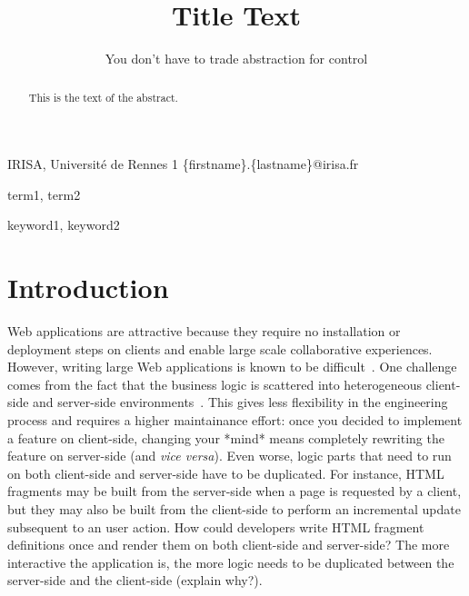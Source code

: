 \documentclass[preprint]{sigplanconf}
\begin{document}
\copyrightdata{[to be supplied]} 


\title{Title Text}
\subtitle{You don’t have to trade abstraction for control}

           {IRISA, Université de Rennes 1}
           {\{firstname\}.\{lastname\}@irisa.fr}

\maketitle

\begin{abstract}
This is the text of the abstract.
\end{abstract}


\terms
term1, term2

\keywords
keyword1, keyword2

\section{Introduction}

Web applications are attractive because they require no installation or deployment steps on clients and enable large
scale collaborative experiences. However, writing large Web applications is known to be
difficult~\cite{Mikkonen08_SpaghettiJs,Preciado05_RIAMethodologyNecessity}. One challenge comes from the fact
that the business logic is scattered into heterogeneous client-side and server-side
environments~\cite{Echeverria09_RIA,Kuuskeri09_PartitioningClientServer}. This gives less flexibility in the
engineering process and requires a higher maintainance effort: once you decided to implement a feature on
client-side, changing your *mind* means completely rewriting the feature on server-side (and \emph{vice versa}).
Even worse, logic parts that need to run on both client-side and server-side have to be duplicated. For instance,
HTML fragments may be built from the server-side when a page is requested by a client, but they may also be built
from the client-side to perform an incremental update subsequent to an user action. How could developers write HTML
fragment definitions once and render them on both client-side and server-side? The more interactive the application
is, the more logic needs to be duplicated between the server-side and the client-side (explain why?).
\end{document}
